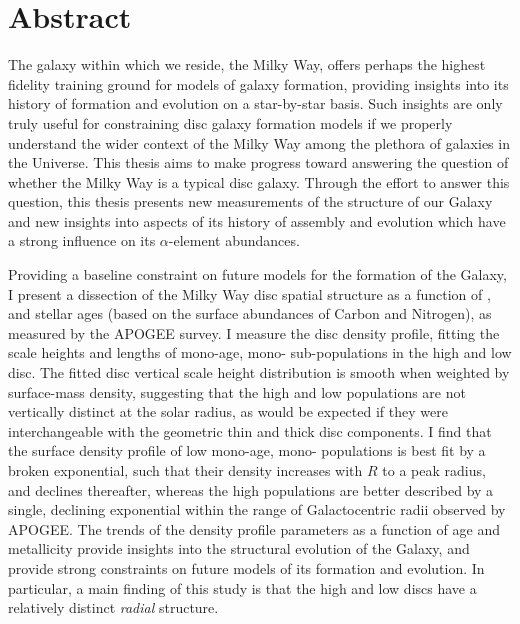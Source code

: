 \chapter*{Abstract}

The galaxy within which we reside, the Milky Way, offers perhaps the highest fidelity training ground for models of galaxy formation, providing insights into its history of formation and evolution on a star-by-star basis. Such insights are only truly useful for constraining disc galaxy formation models if we properly understand the wider context of the Milky Way among the plethora of galaxies in the Universe. This thesis aims to make progress toward answering the question of whether the Milky Way is a typical disc galaxy. Through the effort to answer this question, this thesis presents new measurements of the structure of our Galaxy and new insights into aspects of its history of assembly and evolution which have a strong influence on its $\alpha$-element abundances. 

Providing a baseline constraint on future models for the formation of the Galaxy, I present a dissection of the Milky Way disc spatial structure as a function of \feh{}, \afe{} and stellar ages (based on the surface abundances of Carbon and Nitrogen), as measured by the APOGEE survey. I measure the disc density profile, fitting the scale heights and lengths of mono-age, mono-\feh{} sub-populations in the high and low \afe{} disc. The fitted disc vertical scale height distribution is smooth when weighted by surface-mass density, suggesting that the high and low \afe{} populations are not vertically distinct at the solar radius, as would be expected if they were interchangeable with the geometric thin and thick disc components. I find that the surface density profile of low \afe{} mono-age, mono-\feh{} populations is best fit by a broken exponential, such that their density increases with $R$ to a peak radius, and declines thereafter, whereas the high \afe{} populations are better described by a single, declining exponential within the range of Galactocentric radii observed by APOGEE. The trends of the density profile parameters as a function of age and metallicity provide insights into the structural evolution of the Galaxy, and provide strong constraints on future models of its formation and evolution. In particular, a main finding of this study is that the high and low \afe{} discs have a relatively distinct \emph{radial} structure.

